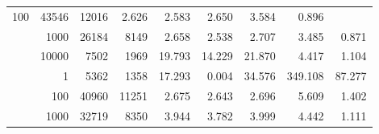 \begin{table}
\begin{tabular}{rrrrrrrrr}
					\multirow{ 1 }{*}{ 100 } &
					
						
							    
							     43546  & 12016  
	                           & 2.626 & 2.583 & 2.650
	                           & 3.584 & 0.896  \\
	                
	            
					 &  
					 
					\multirow{ 1 }{*}{ 1000 } &
					
						
							    
							     26184  & 8149  
	                           & 2.658 & 2.538 & 2.707
	                           & 3.485 & 0.871  \\
	                
	            
					 &  
					 
					\multirow{ 1 }{*}{ 10000 } &
					
						
							    
							     7502  & 1969  
	                           & 19.793 & 14.229 & 21.870
	                           & 4.417 & 1.104  \\
	                
	            
	        
				\noalign{\smallskip}\hline
				\multirow{ 4 }{*}{ 250000 } &
				
					
					 
					\multirow{ 1 }{*}{ 1 } &
					
						
							    
							     5362  & 1358  
	                           & 17.293 & 0.004 & 34.576
	                           & 349.108 & 87.277  \\
	                
	            
					 &  
					 
					\multirow{ 1 }{*}{ 100 } &
					
						
							    
							     40960  & 11251  
	                           & 2.675 & 2.643 & 2.696
	                           & 5.609 & 1.402  \\
	                
	            
					 &  
					 
					\multirow{ 1 }{*}{ 1000 } &
					
						
							    
							     32719  & 8350  
	                           & 3.944 & 3.782 & 3.999
	                           & 4.442 & 1.111  \\
	                

\end{tabular}
\end{table}
